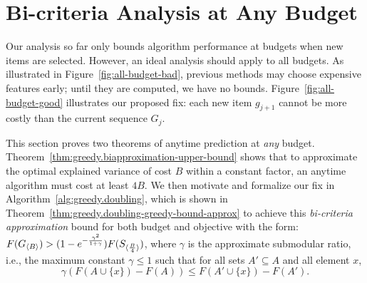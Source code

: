         
        


\section{Bi-criteria Analysis at Any Budget}
\label{sec:gomp_bi_criteria}

Our analysis so far only bounds algorithm performance at 
budgets when new items are selected. However, an ideal analysis
should apply to all budgets. As illustrated in Figure~\ref{fig:all-budget-bad},
previous methods may choose expensive features early; 
until they are computed, we have no bounds. 
Figure~\ref{fig:all-budget-good} illustrates our proposed fix: each 
new item $g_{j+1}$ cannot be more costly than the current sequence $G_{j}$. 

This section proves two theorems of anytime prediction at \textit{any} budget.  Theorem~\ref{thm:greedy.biapproximation-upper-bound} shows that
 to approximate the optimal explained variance 
of cost $B$ within a constant factor,
an anytime algorithm must cost at least $4B$. 
We then motivate and formalize our fix in Algorithm~\ref{alg:greedy.doubling},
which is shown in
Theorem~\ref{thm:greedy.doubling-greedy-bound-approx} to achieve this
\textit{bi-criteria approximation} bound for both budget and objective with
the form: \mbox{$F(G_{\langle B \rangle}) > (1 - e^{-\frac{\gamma^2}{1+\gamma}}) F(S_{\langle \frac{B}{4} \rangle})$}, where $\gamma$ is the approximate submodular
ratio, i.e., the maximum constant $\gamma \leq 1$ such that for 
all sets $ A' \subseteq A$ and all element $x$,
\begin{equation}
\label{def:greedy.approx-submodularity}
    \gamma (F(A \cup \{x\}) - F(A)) \leq F(A' \cup \{x\}) - F(A').
\end{equation}

